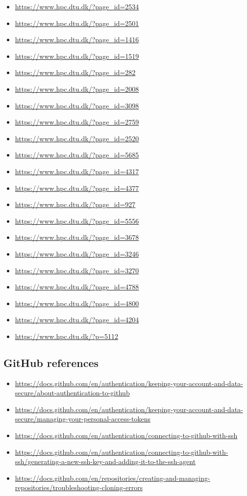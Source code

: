 \documentclass[11pt,a4paper]{article}
\begin{document}
\begin{itemize}[leftmargin=1.5em]
  \item \url{https://www.hpc.dtu.dk/?page_id=2534}
  \item \url{https://www.hpc.dtu.dk/?page_id=2501}
  \item \url{https://www.hpc.dtu.dk/?page_id=1416}
  \item \url{https://www.hpc.dtu.dk/?page_id=1519}
  \item \url{https://www.hpc.dtu.dk/?page_id=282}
  \item \url{https://www.hpc.dtu.dk/?page_id=2008}
  \item \url{https://www.hpc.dtu.dk/?page_id=3098}
  \item \url{https://www.hpc.dtu.dk/?page_id=2759}
  \item \url{https://www.hpc.dtu.dk/?page_id=2520}
  \item \url{https://www.hpc.dtu.dk/?page_id=5685}
  \item \url{https://www.hpc.dtu.dk/?page_id=4317}
  \item \url{https://www.hpc.dtu.dk/?page_id=4377}
  \item \url{https://www.hpc.dtu.dk/?page_id=927}
  \item \url{https://www.hpc.dtu.dk/?page_id=5556}
  \item \url{https://www.hpc.dtu.dk/?page_id=3678}
  \item \url{https://www.hpc.dtu.dk/?page_id=3246}
  \item \url{https://www.hpc.dtu.dk/?page_id=3270}
  \item \url{https://www.hpc.dtu.dk/?page_id=4788}
  \item \url{https://www.hpc.dtu.dk/?page_id=4800}
  \item \url{https://www.hpc.dtu.dk/?page_id=4204}
  \item \url{https://www.hpc.dtu.dk/?p=5112}
\end{itemize}

\subsection{GitHub references}

\begin{itemize}[leftmargin=1.5em]
  \item \url{https://docs.github.com/en/authentication/keeping-your-account-and-data-secure/about-authentication-to-github}
  \item \url{https://docs.github.com/en/authentication/keeping-your-account-and-data-secure/managing-your-personal-access-tokens}
  \item \url{https://docs.github.com/en/authentication/connecting-to-github-with-ssh}
  \item \url{https://docs.github.com/en/authentication/connecting-to-github-with-ssh/generating-a-new-ssh-key-and-adding-it-to-the-ssh-agent}
  \item \url{https://docs.github.com/en/repositories/creating-and-managing-repositories/troubleshooting-cloning-errors}
\end{itemize}
\end{document}

